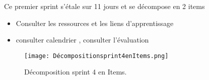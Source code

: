 \begin{fquote}
	Ce premier sprint s’étale sur 11 jours et se décompose en 2 items
\end{fquote}
\smallskip
\begin{itemize}[label=$\diamond$]
	\item Consulter les ressources et les liens d'apprentissage
	
	\item consulter calendrier , consulter l'évaluation
 
	
\end{itemize}
\medskip
\medskip
\medskip
\medskip
\medskip
\medskip
\medskip
\medskip
\medskip
\medskip
\begin{figure}[ht]
	\centering
	\texttt{[image: Décompositionsprint4enItems.png]}
	\caption{Décomposition sprint 4 en Items.}
	\label{fig:Démposition sprint 4 en Items}
\end{figure}
\FloatBarrier
\clearpage


